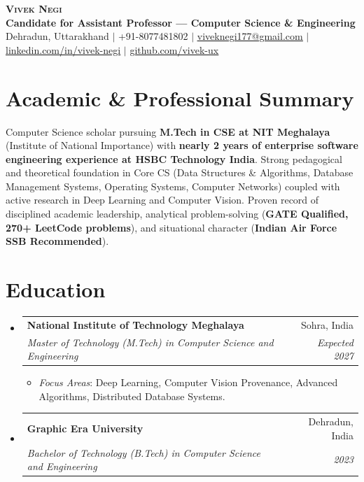 \documentclass[letterpaper,10pt]{article}
\makeatletter
\newcommand{\resumeItem}[1]{
  \item\small{
    {#1 \vspace{-2pt}}
  }
}
\newcommand{\resumeSubheading}[4]{
  \vspace{-2pt}\item
    \begin{tabular*}{0.97\textwidth}[t]{l@{\extracolsep{\fill}}r}
      \textbf{#1} & #2 \\
      \textit{\small#3} & \textit{\small #4} \\
    \end{tabular*}\vspace{-5pt}
}
\newcommand{\resumeSubHeadingListStart}{\begin{itemize}[leftmargin=0.15in, label={}]}
\newcommand{\resumeSubHeadingListEnd}{\end{itemize}}
\newcommand{\resumeItemListStart}{\begin{itemize}[leftmargin=0.15in]}
\newcommand{\resumeItemListEnd}{\end{itemize}\vspace{-4pt}}
\makeatother
\begin{document}
\begin{center}
    \textbf{\Huge \scshape Vivek Negi} \\ \vspace{2pt}
    \small \textbf{Candidate for Assistant Professor — Computer Science \& Engineering} \\
    \small Dehradun, Uttarakhand $|$ +91-8077481802 $|$ \href{mailto:viveknegi177@gmail.com}{\underline{viveknegi177@gmail.com}} $|$ 
    \href{https://linkedin.com/in/vivek-negi-b46070222}{\underline{linkedin.com/in/vivek-negi}} $|$
    \href{https://github.com/vivek-ux}{\underline{github.com/vivek-ux}}
\end{center}

\section{Academic \& Professional Summary}
\small{
Computer Science scholar pursuing \textbf{M.Tech in CSE at NIT Meghalaya} (Institute of National Importance) with \textbf{nearly 2 years of enterprise software engineering experience at HSBC Technology India}. Strong pedagogical and theoretical foundation in Core CS (Data Structures \& Algorithms, Database Management Systems, Operating Systems, Computer Networks) coupled with active research in Deep Learning and Computer Vision. Proven record of disciplined academic leadership, analytical problem-solving (\textbf{GATE Qualified, 270+ LeetCode problems}), and situational character (\textbf{Indian Air Force SSB Recommended}).
}

\section{Education}
  \resumeSubHeadingListStart
    \resumeSubheading
      {National Institute of Technology Meghalaya}{Sohra, India}
      {Master of Technology (M.Tech) in Computer Science and Engineering}{Expected 2027}
      \resumeItemListStart
        \resumeItem{\textit{Focus Areas}: Deep Learning, Computer Vision Provenance, Advanced Algorithms, Distributed Database Systems.}
      \resumeItemListEnd
    \resumeSubheading
      {Graphic Era University}{Dehradun, India}
      {Bachelor of Technology (B.Tech) in Computer Science and Engineering}{2023}
  \resumeSubHeadingListEnd

\end{document}

